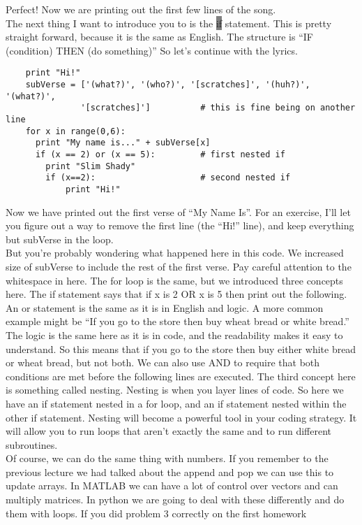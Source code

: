 \documentclass[11pt]{article}   %
\newcommand{\gray}[1]{\colorbox{gray}{#1}}
\begin{document}
Perfect!  Now we are printing out the first few lines of the song.  
\\
The next thing I want to introduce you to is the \gray{if} statement.  This is pretty straight forward, because it is the same as English.  The structure is ``IF (condition) THEN (do something)''
So let's continue with the lyrics.
\begin{tcolorbox}
   \begin{lstlisting}
    print "Hi!"
    subVerse = ['(what?)', '(who?)', '[scratches]', '(huh?)', '(what?)', 
               '[scratches]']          # this is fine being on another line
    for x in range(0,6):
      print "My name is..." + subVerse[x]
      if (x == 2) or (x == 5):         # first nested if
        print "Slim Shady"
        if (x==2):                     # second nested if
            print "Hi!"
   \end{lstlisting}
\end{tcolorbox}
Now we have printed out the first verse of ``My Name Is''.  For an exercise, I'll let you figure out a way to remove the first line (the ``Hi!'' line), and keep everything but subVerse in
the loop.  
\\
But you're probably wondering what happened here in this code.  We increased size of subVerse to include the rest of the first verse.  Pay careful attention to the whitespace in here.
The for loop is the same, but we introduced three concepts here.  The if statement says that if x is 2 OR x is 5 then print out the following.  An or statement is the same as it is in 
English and logic.  A more common example might be ``If you go to the store then buy wheat bread or white bread.''  The logic is the same here as it is in code, and the readability makes
it easy to understand.  So this means that if you go to the store then buy either white bread or wheat bread, but not both.  We can also use AND to require that both conditions are met
before the following lines are executed.  The third concept here is something called nesting.  Nesting is when you layer lines of code.  So here we have an if statement nested in a for loop,
and an if statement nested within the other if statement.  Nesting will become a powerful tool in your coding strategy.  It will allow you to run loops that aren't exactly the same and
to run different subroutines.
\\
Of course, we can do the same thing with numbers.  If you remember to the previous lecture we had talked about the append and pop we can use this to update arrays.  In MATLAB we can have
a lot of control over vectors and can multiply matrices.  In python we are going to deal with these differently and do them with loops.  If you did problem 3 correctly on the first homework
\end{document}
